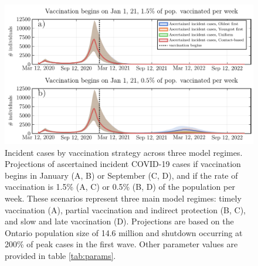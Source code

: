\begin{figure}
\includegraphics[width=\textwidth]{chapter_3/main_text_ts_1.pdf}
\caption{Incident cases by vaccination strategy across three model regimes. Projections of ascertained incident COVID-19 cases if vaccination begins in January (A, B) or September (C, D), and if the rate of vaccination is 1.5\% (A, C) or 0.5\% (B, D) of the population per week. These scenarios represent three main model regimes: timely vaccination (A), partial vaccination and indirect protection (B, C), and slow and late vaccination (D). Projections are based on the Ontario population size of 14.6 million and shutdown occurring at 200\% of peak cases in the first wave. Other parameter values are provided in table \ref{tab:params}.}
\label{fig3}
\end{figure}


